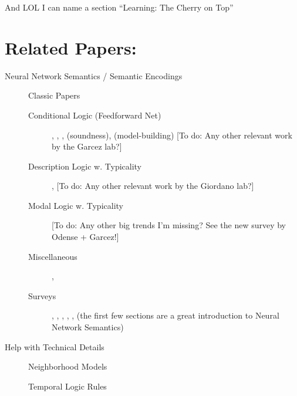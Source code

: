 \documentclass{article}
\newcommand{\todo}[1]{{\color{red!75!black}[To do: #1]}}
\begin{document}
And LOL I can name a section ``Learning: The Cherry on Top''

\section*{Related Papers:}

\begin{description}
  \item[Neural Network Semantics / Semantic Encodings]
  \begin{description}
    \item[Classic Papers] {\cite{mcculloch1943logical}}
    {\cite{hebb-organization-of-behavior-1949}}
    
    \item[Conditional Logic (Feedforward Net)]
    {\cite{balkenius1991nonmonotonic}}, {\cite{leitgeb2001nonmonotonic}},
    {\cite{leitgeb2003nonmonotonic}}, {\cite{garcez2001symbolic}} (soundness),
    {\cite{garcez2008neural}} (model-building) {\todo{Any other relevant work
    by the Garcez lab?}}
    
    \item[Description Logic w. Typicality] {\cite{giordano2021}},
    {\cite{giordano2022conditional}} {\todo{Any other relevant work by the
    Giordano lab?}}
    
    \item[Modal Logic w. Typicality] {\cite{kisby2022logic}}
    
    {\todo{Any other big trends I'm missing? See the new survey by Odense +
    Garcez!}}
    
    \item[Miscellaneous] {\cite{blutner2004nonmonotonic}},
    {\cite{browne2001connectionist}}
    
    \item[Surveys] {\cite{odense2022semantic}} {\cite{bader2005dimensions}},
    {\cite{sarker2021neuro}}, {\cite{kautz-2020future}},
    {\cite{leitgeb2018neural}}, {\cite{belle2021logic}}, {\cite{yu2021survey}}
    (the first few sections are a great introduction to Neural Network
    Semantics)
  \end{description}
  \item[Help with Technical Details]
  \begin{description}
    \item[Neighborhood Models] {\cite{pacuit2017neighborhood}}
    
    \item[Temporal Logic Rules] {\cite{gabbay1994temporal}}
  \end{description}
\end{description}
\end{document}
